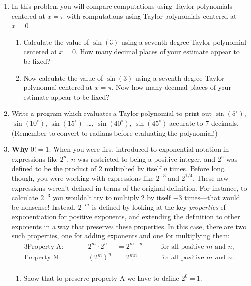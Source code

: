 \begin{enumerate}
\item In this problem you will compare computations using Taylor
polynomials centered at $x=\pi$ with computations using Taylor
polynomials centered at $x=0$.

  \begin{enumerate}
  \item Calculate the value of $\sin(3)$ using a seventh degree Taylor
polynomial centered at $x=0$.  How many decimal places of your estimate
appear to be fixed?

  \item Now calculate the value of $\sin(3)$ using a seventh degree
Taylor polynomial centered at $x=\pi$.  Now how many decimal places of
your estimate appear to be fixed?



\end{enumerate}
\item Write a program which evaluates a Taylor polynomial to print out
$\sin(5^\circ)$, $\sin(10^\circ)$, $\sin(15^\circ)$, \ldots,
$\sin(40^\circ)$, $\sin(45^\circ)$ accurate to 7 decimals.  (Remember
to convert to radians before evaluating the polynomial!)


\item {\bf Why \boldmath $0!=1$}. \quad When you were first introduced to
exponential notation in expressions like $2^n$, $n$ was restricted to
being a positive integer, and $2^n$ was defined to be the product of 2
multiplied by itself $n$ times.  Before long, though, you were working
with expressions like $2^{-3}$ and $2^{1/4}$.  These new expressions
weren't defined in terms of the original definition.  For instance, to
calculate $2^{-3}$ you wouldn't try to multiply 2 by itself $-3$
times---that would be nonsense!  Instead, $2^{-m}$ is defined by
looking at the key {\em properties} of exponentiation for positive
exponents, and extending the definition to other exponents in a way
that preserves these properties.  In this case, there are two such
properties, one for adding exponents and one for multiplying them:
\begin{alignat*}{3}
\text{Property A:}& &\qquad 2^m \cdot 2^n &= 2^{m+n} &\quad 
         &\text{for all positive $m$ and $n$}, \\
\text{Property M:}& &\qquad \left(2^m\right)^n &= 2^{mn} & 
         &\text{for all positive $m$ and $n$}. \\
\end{alignat*}


  \begin{enumerate}
  \item Show that to preserve property A we have to define $2^0=1$.


\end{enumerate}
\end{enumerate}
